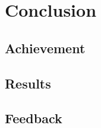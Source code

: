 \chapter{Conclusion} \label{Chapter:sixth}



\section{Achievement}

\section{Results}

\section{Feedback}